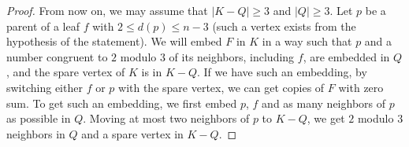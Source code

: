 \documentclass[10pt,a4paper]{amsart}
\begin{document}
\begin{proof}
    From now on, we may assume that $|K-Q| \geq 3$ and $|Q| \geq 3$. Let $p$ be a parent of a leaf $f$ with $2 \leq d(p) \leq n-3$ (such a vertex exists from the hypothesis of the statement). We will embed $F$ in $K$ in a way such that $p$ and a number congruent to $2$ modulo $3$ of its neighbors, including $f$, are embedded in $Q$, and the spare vertex of $K$ is in $K-Q$. If we have such an embedding, by switching either $f$ or $p$ with the spare vertex, we can get copies of $F$ with zero sum. To get such an embedding, we first embed $p$, $f$ and as many neighbors of $p$ as possible in $Q$. Moving at most two neighbors of $p$ to $K-Q$, we get $2$ modulo $3$ neighbors in $Q$ and a spare vertex in $K-Q$.
    
\end{proof}
\end{document}
